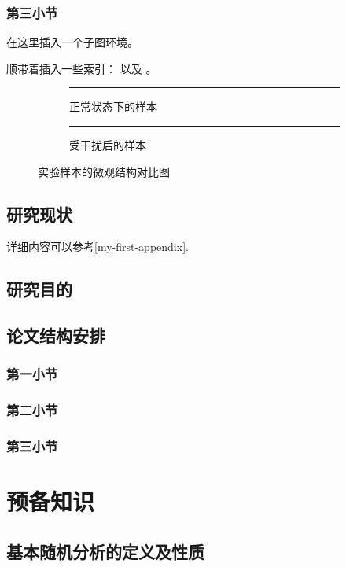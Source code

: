 \documentclass[bibbackend=biber]{csuthesis}
\theoremstyle{csutheorem}
\begin{document}
\subsection{第三小节}
在这里插入一个子图环境。

顺带着插入一些索引：\cite{2012-Seregin-JDE} 以及 \cite{Cho2024-STCM-Ring}。
\begin{figure}[ht]
    \centering
    \begin{subfigure}{0.45\textwidth}
        \centering
        \rule{4cm}{3cm} %
        \caption{正常状态下的样本} %
    \end{subfigure}
    \hfill %
    \begin{subfigure}{0.45\textwidth}
        \centering
        \rule{4cm}{3cm}
        \caption{受干扰后的样本} %
    \end{subfigure}
    
    \caption{实验样本的微观结构对比图} %
\end{figure}

\section{研究现状}
详细内容可以参考\ref{my-first-appendix}.
\section{研究目的}
\section{论文结构安排}
\subsection{第一小节}
\subsection{第二小节}
\subsection{第三小节}

\chapter{预备知识}
\section{基本随机分析的定义及性质}
\end{document}
